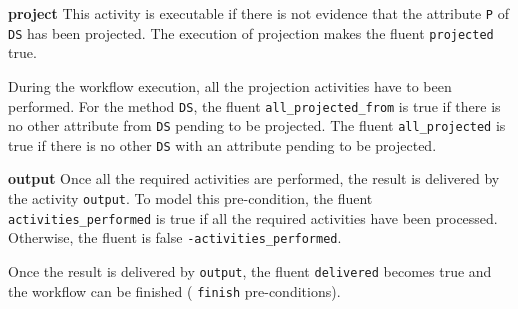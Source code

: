 \textbf{project} This activity is executable if there is not evidence that the attribute \texttt{P} of \texttt{DS} has been projected. The execution of projection makes the fluent \texttt{projected} true.
               
%



During the workflow execution, all the projection activities have to been performed. For the method \texttt{DS}, the fluent \texttt{all\_projected\_from} is true if there is no other attribute from \texttt{DS} pending to be projected. The fluent \texttt{all\_projected} is true if there is no other \texttt{DS} with an attribute pending to be projected.
                
%


                    
\textbf{output} Once all the required activities are performed, the result is delivered by the activity \texttt{output}. To model this pre-condition, the fluent \texttt{activities\_performed} is true if all the required activities have been processed. Otherwise, the fluent is false \texttt{-activities\_performed}.

%



Once the result is delivered by \texttt{output}, the fluent \texttt{delivered} becomes true and the workflow can be finished (\cf{} \texttt{finish} pre-conditions).

%






